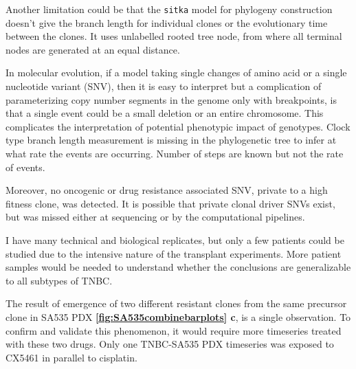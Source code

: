 Another limitation could be that the \texttt{sitka} model for phylogeny construction doesn't give the branch length for individual clones or the evolutionary time between the clones. It  uses unlabelled rooted tree node, from where all terminal nodes are generated at an equal distance. 
 
 In molecular evolution, if a model taking single changes of amino acid or a single nucleotide variant (SNV), then it is easy to interpret but a complication of parameterizing copy number segments in the genome only with breakpoints, is that a single event could be a small deletion or an entire chromosome. This complicates the interpretation of potential phenotypic impact of genotypes. 
 Clock type branch length measurement is missing in the phylogenetic tree to infer at what rate the events are occurring. Number of steps are known but not the rate of events.

Moreover, no oncogenic or drug resistance associated SNV, private to a high fitness clone, was detected.  It is possible that private clonal driver SNVs exist, but was missed either at sequencing or by the computational pipelines.

I have many technical and biological replicates, but only a few patients could be studied due to the intensive nature of the transplant experiments. More patient samples would be needed to understand whether the conclusions are generalizable to all subtypes of TNBC.


The result of emergence of two different resistant clones from the same precursor clone in SA535 PDX \textbf{\autoref{fig:SA535combinebarplots} c}, is a single observation. To confirm and validate this phenomenon, it would require more timeseries treated with these two drugs. Only one TNBC-SA535 PDX timeseries was exposed to CX5461 in parallel to cisplatin. 





